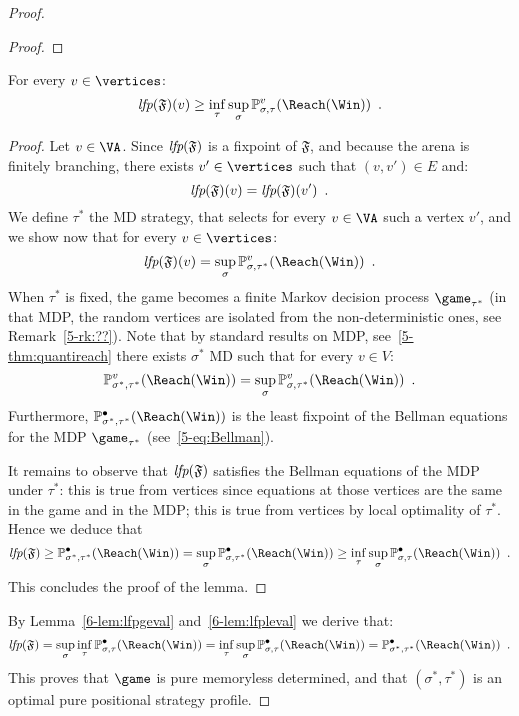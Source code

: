 \begin{proof}
\begin{proof}
  \end{proof}

  \begin{lemma}
    \label{6-lem:lfpleval}
    For every $v \in \vertices$:
    \[
    \lfp(\mathfrak{F})(v) \ge \inf_\tau \sup_\sigma
    \probm_{\sigma,\tau}^v(\Reach(\Win)) \enspace.
    \]
  \end{lemma}

  \begin{proof}
    Let $v \in \VA$. Since $\textit{lfp}(\mathfrak{F})$ is a fixpoint of
    $\mathfrak{F}$, and because the arena is finitely branching, there exists $v'\in \vertices$ such
    that $(v,v') \in E$ and:
    \[
      \textit{lfp}(\mathfrak{F})(v) = \textit{lfp}(\mathfrak{F})(v') \enspace.
    \]
    We define $\tau^*$ the MD strategy, that selects for every
    $v\in \VA$ such a vertex $v'$, and we show now that for every
    $v \in \vertices$:
    \[
    \lfp(\mathfrak{F})(v) = \sup_\sigma
    \probm_{\sigma,\tau^*}^v(\Reach(\Win)) \enspace.
    \]
    When $\tau^*$ is fixed, the game becomes a finite Markov decision
    process $\game_{\tau^*}$ (in that MDP, the random vertices are
    isolated from the non-deterministic ones, see
    Remark~\ref{5-rk:??}). Note that by standard results on MDP,
    see~\ref{5-thm:quantireach} there exists $\sigma^*$ MD such that
    for every $v \in V$:
    \[
    \probm_{\sigma^*,\tau^*}^v(\Reach(\Win)) = \sup_\sigma
    \probm_{\sigma,\tau^*}^v(\Reach(\Win)) \enspace.
    \]
    Furthermore, $\probm_{\sigma^*,\tau^*}^\bullet(\Reach(\Win))$ is
    the least fixpoint of the Bellman equations for the MDP
    $\game_{\tau^*}$ (see~\ref{5-eq:Bellman}).
    
    It remains to observe that $\textit{lfp}(\mathfrak{F})$ satisfies the
    Bellman equations of the MDP under $\tau^*$: this is true from
    \Eve vertices since equations at those vertices are the same in
    the game and in the MDP; this is true from \Adam vertices by local
    optimality of $\tau^*$. Hence we deduce that
    \[
      \lfp(\mathfrak{F}) \ge
      \probm_{\sigma^*,\tau^*}^\bullet(\Reach(\Win)) = \sup_\sigma
      \probm_{\sigma,\tau^*}^\bullet(\Reach(\Win)) \ge \inf_\tau
      \sup_\sigma \probm_{\sigma,\tau}^\bullet(\Reach(\Win)) \enspace.
    \]
    This concludes the proof of the lemma. 
  \end{proof}
By Lemma~\ref{6-lem:lfpgeval} and~\ref{6-lem:lfpleval}  we derive that:
 \[
   \lfp(\mathfrak{F}) =
   \sup_\sigma \inf_\tau 
    \probm_{\sigma,\tau}^\bullet(\Reach(\Win)) =  \inf_\tau \sup_\sigma
   \probm_{\sigma,\tau}^\bullet(\Reach(\Win)) = 
   \probm_{\sigma^*,\tau^*}^\bullet(\Reach(\Win)) \enspace.
  \]
  This proves that $\game$ is pure memoryless determined, and that
  $(\sigma^*,\tau^*)$ is an optimal pure positional strategy profile.
   
\end{proof}

